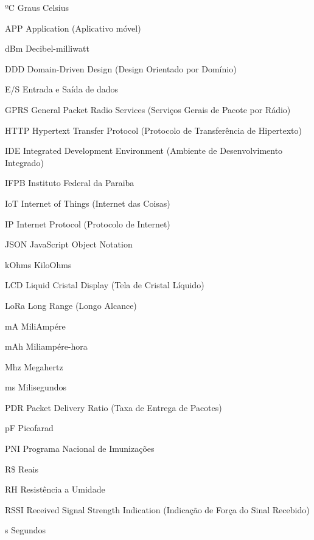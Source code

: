 \listoffigures*
\cleardoublepage

\listoftables*
\cleardoublepage

\begin{siglas}
  \item[ºC]     Graus Celsius 
  \item[APP]    Application (Aplicativo móvel)
  \item[dBm]    Decibel-milliwatt
  \item[DDD]    Domain-Driven Design (Design Orientado por Domínio)
  \item[E/S]    Entrada e Saída de dados
  \item[GPRS]   General Packet Radio Services (Serviços Gerais de Pacote por Rádio)
  \item[HTTP]   Hypertext Transfer Protocol (Protocolo de Transferência de Hipertexto)
  \item[IDE]    Integrated Development Environment (Ambiente de Desenvolvimento Integrado)
  \item[IFPB]   Instituto Federal da Paraiba
  \item[IoT]    Internet of Things (Internet das Coisas)
  \item[IP]     Internet Protocol (Protocolo de Internet)
  \item[JSON]   JavaScript Object Notation
  \item[kOhms]  KiloOhms
  \item[LCD]    Liquid Cristal Display (Tela de Cristal Líquido)
  \item[LoRa]   Long Range (Longo Alcance)
  \item[mA]     MiliAmpére
  \item[mAh]    Miliampére-hora
  \item[Mhz]    Megahertz
  \item[ms]     Milisegundos
  \item[PDR]    Packet Delivery Ratio (Taxa de Entrega de Pacotes)
  \item[pF]     Picofarad
  \item[PNI]    Programa Nacional de Imunizações
  \item[R\$]    Reais 
  \item[RH]     Resistência a Umidade
  \item[RSSI]   Received Signal Strength Indication (Indicação de Força do Sinal Recebido)
  \item[s]      Segundos

\end{siglas}
